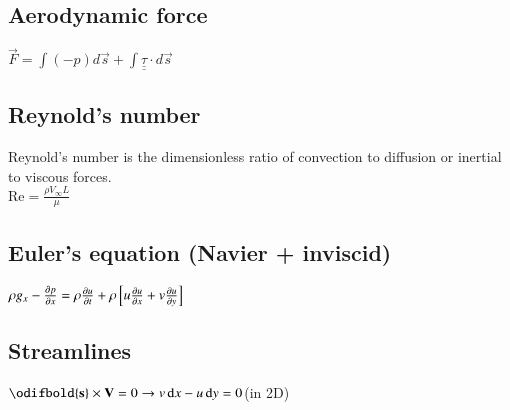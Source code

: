 \subsection*{Aerodynamic force}
$\vec{F}=\int\left(-p\right)d\vec{s}+\int\underline{\underline{\tau}}\cdot d\vec{s}$
\subsection*{Reynold's number}
Reynold's number is the dimensionless ratio of convection to diffusion or inertial to viscous forces.\\
$\text{Re}=\frac{\rho V_\infty L}{\mu}$
\subsection*{Euler's equation (Navier + inviscid)}
$\rho g_x - \pdv{p}{x} = \rho \pdv{u}{t} + \rho \left[u \pdv{u}{x} + v \pdv{u}{y}\right]$
\subsection*{Streamlines}
$\odifbold{\mathbf{s}} \times \mathbf{V} = 0 \to v\odif{x} - u\odif{y}=0$\hfill(in 2D)
